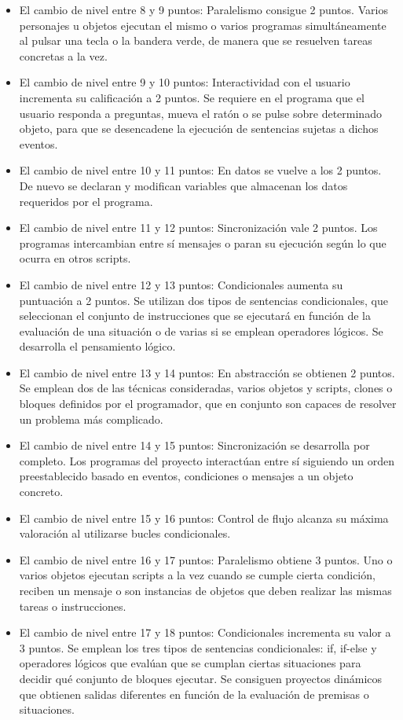 \documentclass[a4paper, 12pt]{book}
\begin{document}
\begin{itemize}
 \item El cambio de nivel entre 8 y 9 puntos: Paralelismo consigue 2 puntos. Varios personajes u objetos ejecutan el mismo o varios programas simultáneamente al pulsar una tecla o la bandera verde, de manera que se resuelven tareas concretas a la vez.
 \item El cambio de nivel entre 9 y 10 puntos: Interactividad con el usuario incrementa su calificación a 2 puntos. Se requiere en el programa que el usuario responda a preguntas, mueva el ratón o se pulse sobre determinado objeto, para que se desencadene la ejecución de sentencias sujetas a dichos eventos.
 \item El cambio de nivel entre 10 y 11 puntos: En datos se vuelve a los 2 puntos. De nuevo se declaran y modifican variables que almacenan los datos requeridos por el programa.
 \item El cambio de nivel entre 11 y 12 puntos: Sincronización vale 2 puntos. Los programas intercambian entre sí mensajes o paran su ejecución según lo que ocurra en otros scripts.
 \item El cambio de nivel entre 12 y 13 puntos: Condicionales aumenta su puntuación a 2 puntos. Se utilizan dos tipos de sentencias condicionales, que seleccionan el conjunto de instrucciones que se ejecutará en función de la evaluación de una situación o de varias si se emplean operadores lógicos. Se desarrolla el pensamiento lógico.
 \item El cambio de nivel entre 13 y 14 puntos: En abstracción se obtienen 2 puntos. Se emplean dos de las técnicas consideradas, varios objetos y scripts, clones o bloques definidos por el programador, que en conjunto son capaces de resolver un problema más complicado.
 \item El cambio de nivel entre 14 y 15 puntos: Sincronización se desarrolla por completo. Los programas del proyecto interactúan entre sí siguiendo un orden preestablecido basado en eventos, condiciones o  mensajes a un objeto concreto. 
 \item El cambio de nivel entre 15 y 16 puntos: Control de flujo alcanza su máxima valoración al utilizarse bucles condicionales.
 \item El cambio de nivel entre 16 y 17 puntos: Paralelismo obtiene 3 puntos. Uno o varios objetos ejecutan scripts a la vez cuando se cumple cierta condición, reciben un mensaje o son instancias de objetos que deben realizar las mismas tareas o instrucciones.
 \item El cambio de nivel entre 17 y 18 puntos: Condicionales incrementa su valor a 3 puntos. Se emplean los tres tipos de sentencias condicionales: if, if-else y operadores lógicos que evalúan que se cumplan ciertas situaciones para decidir qué conjunto de bloques ejecutar. Se consiguen proyectos dinámicos que obtienen salidas diferentes en función de la evaluación de premisas o situaciones.

\end{itemize}
\end{document}
